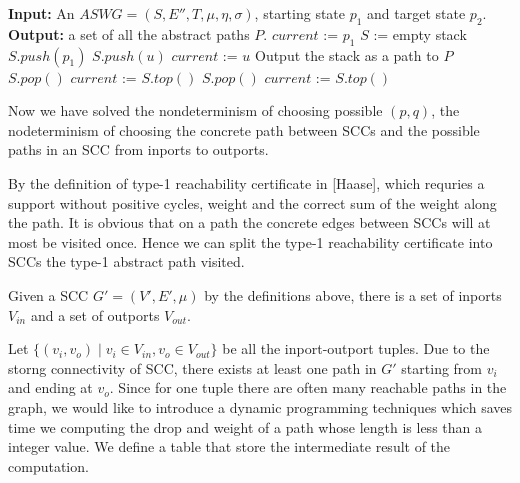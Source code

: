 \documentclass{article}
\begin{document}
\begin{itemize}
\begin{algorithm}
\begin{algorithmic}
		\State {}
			\State \textbf{Input: }An $ASWG = (S,E'',T,\mu,\eta,\sigma)$, starting state $p_1$ and target state $p_2$.
			\State \textbf{Output: }a set of all the abstract paths $P$.
			\State $current$ := $p_1$
			\State $S$ := empty stack
			\State $S.push(p_1)$
				\State $S.push(u)$
				\State $current$ := $u$
					\State Output the stack as a path to $P$
					\State $S.pop()$
					\State $current$ := $S.top()$
				\EndIf				
					\State $S.pop()$
					\State $current$ := $S.top()$
				\EndIf
			\EndWhile
		\EndFunction
	\end{algorithmic}
\end{algorithm}

Now we have solved the nondeterminism of choosing possible $(p,q)$, the nodeterminism of choosing the concrete path between SCCs and the possible paths in an SCC from inports to outports. 



By the definition of type-1 reachability certificate in [Haase], which requries a support without positive cycles, weight and the correct sum of the weight along the path. It is obvious that on a path the concrete edges between SCCs will at most be visited once. Hence we can split the type-1 reachability certificate into SCCs the type-1 abstract path visited.


Given a SCC $G' = (V', E', \mu)$ by the definitions above, there is a set of inports $V_{in}$ and a set of outports $V_{out}$.

Let $\{(v_{i}, v_{o})\mid v_i\in V_{in}, v_o \in V_{out}\}$  be all the inport-outport tuples. Due to the storng connectivity of SCC, there exists at least one path in $G'$ starting from $v_i$ and ending at $v_o$. Since for one tuple there are often many reachable paths in the graph, we would like to introduce a dynamic programming techniques which saves time we computing the drop and weight of a path whose length is less than a integer value. We define a table that store the intermediate result of the computation.




\end{itemize}
\end{document}
